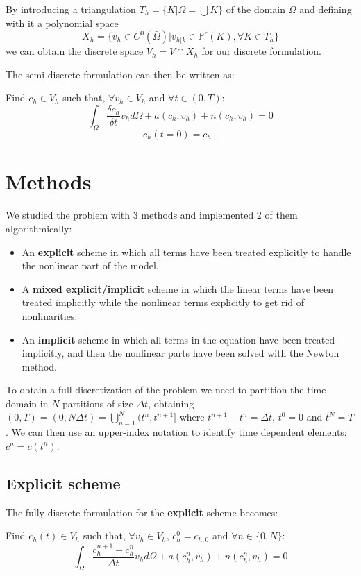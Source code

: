 \documentclass[12pt, letterpaper]{article}
\begin{document}
\noindent By introducing a triangulation $T_h=\{K|\Omega=\bigcup K\}$ of the domain $\Omega$ and defining with it a polynomial space $$X_h=\{v_h\in C^0(\bar\Omega)|v_{h|k}\in\mathbb{P}^r(K),\forall K\in T_h\}$$ we can obtain the discrete space $V_h=V\cap X_h$ for our discrete formulation.

\noindent The semi-discrete formulation can then be written as:

\vspace{1em}
\noindent
Find $c_h\in V_h$ such that, $\forall v_h\in V_h$ and $\forall t\in(0,T)$:
$$\int_\Omega\frac{\delta c_h}{\delta t}v_hd\Omega+a(c_h,v_h)+n(c_h,v_h)=0$$
$$c_h(t=0)=c_{h,0}$$

\section{Methods}

We studied the problem with 3 methods and implemented 2 of them algorithmically:
\begin{itemize}
    \item An \textbf{explicit} scheme in which all terms have been treated explicitly to handle the nonlinear part of the model.
    \item A \textbf{mixed explicit/implicit} scheme in which the linear terms have been treated implicitly while the nonlinear terms explicitly to get rid of nonlinarities.
    \item An \textbf{implicit} scheme in which all terms in the equation have been treated implicitly, and then the nonlinear parts have been solved with the Newton method.
\end{itemize}

\noindent To obtain a full discretization of the problem we need to partition the time domain in $N$ partitions of size $\Delta t$, obtaining $(0, T)=(0,N\Delta t)=\bigcup_{n=1}^N(t^n, t^{n+1}]$ where $t^{n+1}-t^n=\Delta t$, $t^0=0$ and $t^N=T$. We can then use an upper-index notation to identify time dependent elements: $c^n = c(t^n)$.

\subsection{Explicit scheme}

The fully discrete formulation for the \textbf{explicit} scheme becomes:

\vspace{1em}
\noindent
Find $c_h(t)\in V_h$ such that, $\forall v_h\in V_h$, $c_h^0=c_{h,0}$ and $\forall n\in\{0, N\}$:
$$\int_\Omega\frac{c_h^{n+1}-c_h^n}{\Delta t}v_hd\Omega+a(c_h^n,v_h)+n(c_h^n,v_h)=0$$
\end{document}
